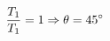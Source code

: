 \documentclass[preview]{standalone}
\begin{document}
\begin{align*}
\special{dvisvgm:raw <g id='unique000'>}\frac{T_1}{T_1} = 1 \Rightarrow \theta = 45^{\circ}\special{dvisvgm:raw </g>}
\end{align*}
\end{document}
